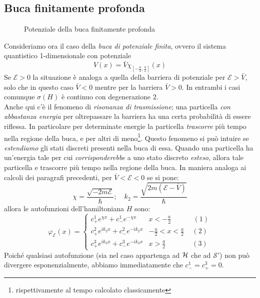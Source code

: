 \documentclass[../../FisicaTeorica.tex]{subfiles}
\begin{document}
\subsection{Buca finitamente profonda}
\begin{figure}[H]
\centering

\caption{Potenziale della buca finitamente profonda}
\end{figure}

Consideriamo ora il caso della \textit{buca di potenziale finita}, ovvero il sistema quantistico 1-dimensionale con potenziale
\[
V(x)=\bar{V}\chi_{\left[-\frac{a}{2},\frac{a}{2}\right]}(x)
\]
Se $\mathcal{E}>0$ la situazione è analoga a quella della barriera di potenziale per $\mathcal{E}>\bar{V}$, solo che in questo caso $\bar{V}<0$ mentre per la barriera $\bar{V}>0$. In entrambi i casi comunque $\sigma(H)$ è continuo con degenerazione $2$.\\
Anche qui c'è il fenomeno di \emph{risonanza di trasmissione}; una particella \emph{con abbastanza energia} per oltrepassare la barriera ha una certa probabilità di essere riflessa. In particolare per determinate energie la particella \emph{trascorre} più tempo nella regione della buca, e per altri di meno\footnote{rispettivamente al tempo calcolato classicamente}. Questo fenomeno si può intuire  se \textit{estendiamo} gli stati discreti presenti nella buca  di essa. Quando una particella ha un'energia tale per cui \textit{corrisponderebbe} a uno stato discreto \textit{esteso}, allora tale particella  e trascorre più tempo nella regione della buca. In maniera analoga ai calcoli dei paragrafi precedenti, per $\bar{V}< \mathcal{E}<0$ se si pone:
\[
\chi=\frac{\sqrt{-2m\mathcal{E}}}{\hbar}; \quad k_2=\frac{\sqrt{2m(\mathcal{E}-\bar{V})}}{\hbar}
\]
allora le autofunzioni dell'hamiltoniana $H$ sono:
\[
\varphi_\mathcal{E}(x)=\begin{cases}
c^1_+ e^{\chi x} + c^1_- e^{-\chi x} & x<-\frac{a}{2} \quad \qquad \, (1)\\
c^2_+ e^{ik_2 x} + c^2_- e^{-ik_2 x} & -\frac{a}{2}<x<\frac{a}{2}\quad \, (2)\\
c^3_+ e^{ik_3 x}+c^3_- e^{-ik_3 x} & x > \frac{a}{2} \ \quad \ \qquad \, \, (3)
\end{cases}
\]
Poiché qualsiasi autofunzione (sia nel caso appartenga ad $\mathcal{H}$ che ad $\mathcal{S}'$) non può divergere esponenzialmente, abbiamo immediatamente che $c^1_- = c^3_+ = 0$.\\
\end{document}

